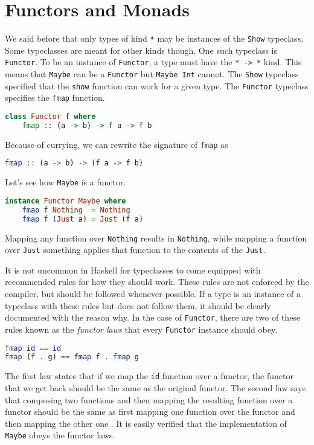 \documentclass[MS, xcolor=dvipsnames]{wfuthesis}
\theoremstyle{definition}
\begin{document}
\section{Functors and Monads}
We said before that only types of kind \lstinline{*} may be instances of the \lstinline{Show} typeclass. Some typeclasses are meant for other kinds though. One such typeclass is \lstinline{Functor}. To be an instance of \lstinline{Functor}, a type must have the \lstinline{* -> *} kind. This means that \lstinline{Maybe} can be a \lstinline{Functor} but \lstinline{Maybe Int} cannot. The \lstinline{Show} typeclass specified that the \lstinline{show} function can work for a given type. The \lstinline{Functor} typeclass specifies the \lstinline{fmap} function.
\begin{lstlisting}[language=Haskell]
class Functor f where
    fmap :: (a -> b) -> f a -> f b
\end{lstlisting}
Because of currying, we can rewrite the signature of \lstinline{fmap} as
\begin{lstlisting}[language=Haskell]
fmap :: (a -> b) -> (f a -> f b)
\end{lstlisting}
Let's see how \lstinline{Maybe} is a functor.
\begin{lstlisting}[language=Haskell]
instance Functor Maybe where
    fmap f Nothing  = Nothing
    fmap f (Just a) = Just (f a)
\end{lstlisting}
Mapping any function over \lstinline{Nothing} results in \lstinline{Nothing}, while mapping a function over \lstinline{Just} something applies that function to the contents of the \lstinline{Just}. \par
It is not uncommon in Haskell for typeclasses to come equipped with recommended rules for how they should work. These rules are not enforced by the compiler, but should be followed whenever possible. If a type is an instance of a typeclass with these rules but does not follow them, it should be clearly documented with the reason why. In the case of \lstinline{Functor}, there are two of these rules known as the \emph{functor laws} that every \lstinline{Functor} instance should obey.
\begin{lstlisting}[language=Haskell]
fmap id == id
fmap (f . g) == fmap f . fmap g
\end{lstlisting}
The first law states that if we map the \lstinline{id} function over a functor, the functor that we get back should be the same as the original functor. The second law says that composing two functions and then mapping the resulting function over a functor should be the same as first mapping one function over the functor and then mapping the other one \cite{Lipovaca2011}. It is easily verified that the implementation of \lstinline{Maybe} obeys the functor laws. \par
\end{document}
